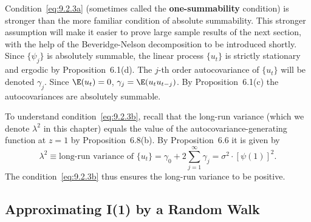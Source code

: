 Condition~\eqref{eq:9.2.3a} (sometimes called the \textbf{one-summability} condition) is
stronger than the more familiar condition of absolute summability. This stronger
assumption will make it easier to prove large sample results of the next section,
with the help of the Beveridge-Nelson decomposition to be introduced shortly.
Since $\{\psi_j\}$ is absolutely summable, the linear process $\{u_t\}$ is strictly stationary
and ergodic by Proposition~6.1(d). The $j$-th order autocovariance of $\{u_t\}$ will be
denoted $\gamma_j$. Since $\E(u_t) = 0$, $\gamma_j = \E(u_t u_{t-j})$. By Proposition~6.1(c) the autocovariances are absolutely summable.

To understand condition~\eqref{eq:9.2.3b}, recall that the long-run variance (which we
denote $\lambda^2$ in this chapter) equals the value of the autocovariance-generating function at $z = 1$ by Proposition~6.8(b). By Proposition~6.6 it is given by
\begin{equation}
\label{eq:9.2.4}
\lambda^2 \equiv \text{long-run variance of } \{u_t\}
= \gamma_0 + 2 \sum_{j=1}^{\infty} \gamma_j
= \sigma^2 \cdot [\psi(1)]^2.
\end{equation}
The condition~\eqref{eq:9.2.3b} thus ensures the long-run variance to be positive.

\subsection*{Approximating I(1) by a Random Walk}

